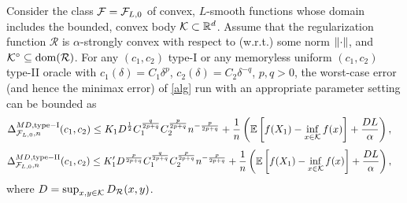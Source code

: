 \begin{theorem}
\label{thm:ub}
Consider the class $\mathcal{F}=\mathcal{F}_{L,0}$ of convex, $L$-smooth functions whose domain includes the bounded, convex body $\mathcal{K} \subset \mathbb{R}^d$. 
Assume that the regularization function $\mathcal{R}$ is $\alpha$-strongly convex with respect to (w.r.t.)  some norm $\left\|\cdot\right\|$, and $\mathcal{K}^\circ\subseteq \operatorname{dom}(\mathcal{R})$.
For any $(c_1,c_2)$ type-I or any memoryless uniform $(c_1,c_2)$ type-II oracle 
with $c_1(\delta) = C_1 \delta^p$, $c_2(\delta) = C_2 \delta^{-q}$, $p,q>0$, 
the worst-case error (and hence the minimax error) of \cref{alg} run with an appropriate parameter setting
can be bounded as 
 \begin{align}
 \label{eq:MDbound1TypeI}
 \Delta_{\mathcal{F}_{L,0},n}^{MD, \mathrm{type-I}}(c_1,c_2) 
 &\leq  K_1 D^{ \frac{1}{2}} C_1^{\frac{q}{2p+q} } C_2^{\frac{p}{2p+q}} n ^{-\frac{p}{2p+q}} + \frac{1}{n}\left(\mathbb{E}\left[f(X_1)-\inf_{x \in \mathcal{K}}f(x)\right]+\frac{DL}{\alpha}  \right),
 \end{align}
 \begin{align}
 \label{eq:MDbound1}
 \Delta_{\mathcal{F}_{L,0},n}^{MD, \mathrm{type-II}}(c_1,c_2) 
 &\leq  K'_1 D^{ \frac{p}{2p+q}} C_1^{\frac{q}{2p+q} } C_2^{\frac{p}{2p+q}} n ^{-\frac{p}{2p+q}} + \frac{1}{n}\left(\mathbb{E}\left[f(X_1)-\inf_{x \in \mathcal{K}}f(x)\right]+\frac{DL}{\alpha}  \right),
 \end{align}
 where $D=\sup_{x,y\in \mathcal{K}} D_{\mathcal{R}}(x,y)$.


\end{theorem}
